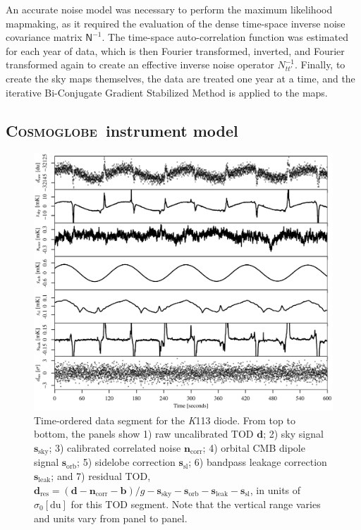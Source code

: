 \documentclass[twocolumn]{../../common/aa}
\newcommand{\cosmoglobe}{\textsc{Cosmoglobe}}
\newcommand{\K}[0]{\textit K}
\begin{document}
An accurate noise model was necessary to perform the maximum likelihood mapmaking, as it required the evaluation of the dense time-space inverse noise covariance matrix  $\mathsf N^{-1}$. The time-space auto-correlation function was estimated for each year of data, which is then Fourier transformed, inverted, and Fourier transformed again to create an effective inverse noise operator $N_{tt'}^{-1}$. 
Finally, to create the sky maps themselves, the data are treated one year at a time, and the iterative Bi-Conjugate Gradient Stabilized Method \citep[BiCG-STAB,][]{bicgstab,bicgstab_template} is applied to the maps.

\subsection{\cosmoglobe\ instrument model}
\label{sec:cosmoglobe_instmodel}

\begin{figure}
	\includegraphics[width=\textwidth]{figures/K113_timestreams.pdf}
	\caption{Time-ordered data segment for the \K113 diode. From top to bottom, the panels show 1) raw uncalibrated TOD $\boldsymbol d$; 2) sky signal $\boldsymbol s_\mathrm{sky}$; 3) calibrated correlated noise $\boldsymbol n_\mathrm{corr}$; 4) orbital CMB dipole signal $\boldsymbol s_\mathrm{orb}$; 5) sidelobe correction $\boldsymbol s_\mathrm{sl}$; 6) bandpass leakage correction $\boldsymbol s_\mathrm{leak}$; and 7) residual TOD, $\boldsymbol d_\mathrm{res}=(\boldsymbol d -\boldsymbol n_\mathrm{corr}-\boldsymbol b)/g-\boldsymbol s_\mathrm{sky}-\boldsymbol s_\mathrm{orb}-\boldsymbol s_\mathrm{leak} -\boldsymbol s_\mathrm{sl}$, in units of $\sigma_0[\mathrm{du}]$ for this TOD segment. Note that the vertical range varies and units vary from panel to panel.
		}
	\label{fig:timestreams}
\end{figure}
\end{document}
